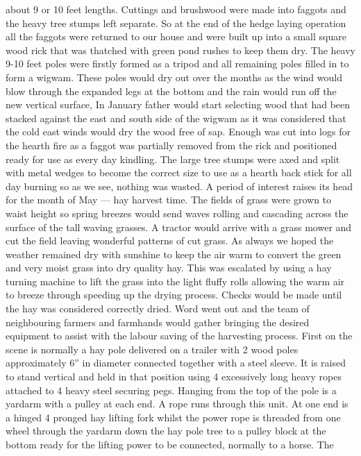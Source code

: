 about 9 or 10 feet lengths.  Cuttings and brushwood were made into faggots and
the heavy tree stumps left separate.  So at the end of the hedge laying
operation all the faggots were returned to our house and were built up into a
small square wood rick that was thatched with green pond rushes to keep them
dry.  The heavy 9-10 feet poles were firstly formed as a tripod and all
remaining poles filled in to form a wigwam.  These poles would dry out over the
months as the wind would blow through the expanded legs at the bottom and the
rain would run off the new vertical surface, In January father would start
selecting wood that had been stacked against the east and south side of the
wigwam as it was considered that the cold east winds would dry the wood free of
sap.  Enough was cut into logs for the hearth fire as a faggot was partially
removed from the rick and positioned ready for use as every day kindling.  The
large tree stumps were axed and split with metal wedges to become the correct
size to use as a hearth back stick for all day burning so as we see, nothing
was wasted. A period of interest raises its head for the month of May --- hay
harvest time.  The fields of grass were grown to waist height so spring breezes
would send waves rolling and cascading across the surface of the tall waving
grasses.   A tractor would arrive with a grass mower and cut the field leaving
wonderful patterns of cut grass.  As always we hoped the weather remained dry
with sunshine to keep the air warm to convert the green and very moist grass
into dry quality hay.  This was escalated by using a hay turning machine to
lift the grass into the light fluffy rolls allowing the warm air to breeze
through speeding up the drying process.  Checks would be made until the hay was
considered correctly dried.   Word went out and the team of neighbouring
farmers and farmhands would gather bringing the desired equipment to assist
with the labour saving of the harvesting process.  First on the scene is
normally a hay pole delivered on a trailer with 2 wood poles approximately 6''
in diameter connected together with a steel sleeve.  It is raised to stand
vertical and held in that position using 4 excessively long heavy ropes
attached to 4 heavy steel securing pegs.  Hanging from the top of the pole is a
yardarm with a pulley at each end.  A rope runs through this unit.   At one end
is a hinged 4 pronged hay lifting fork whilst the power rope is threaded from
one wheel through the yardarm down the hay pole tree to a pulley block at the
bottom ready for the lifting power to be connected, normally to a horse.  The
